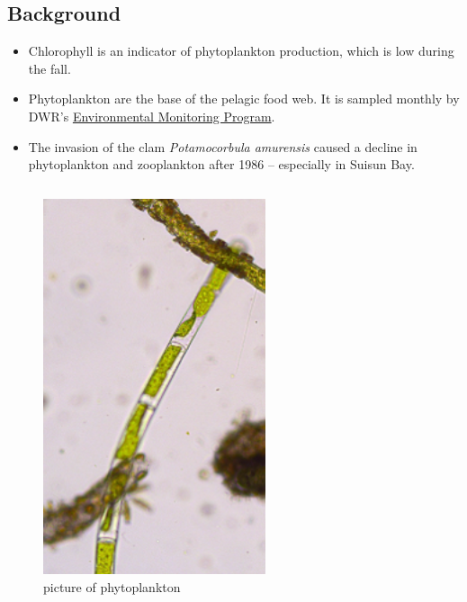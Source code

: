 \documentclass[
]{book}
\providecommand{\tightlist}{%
  \setlength{\itemsep}{0pt}\setlength{\parskip}{0pt}}
\begin{document}
\begin{columns-nocenter}

\begin{column}

\hypertarget{background-2}{%
\subsection{Background}\label{background-2}}

\begin{itemize}
\tightlist
\item
  Chlorophyll is an indicator of phytoplankton production, which is low during the fall.
\item
  Phytoplankton are the base of the pelagic food web. It is sampled monthly by DWR's \href{https://emp.baydeltalive.com/wiki/12297}{Environmental Monitoring Program}.
\item
  The invasion of the clam \emph{Potamocorbula amurensis} caused a decline in phytoplankton and zooplankton after 1986 -- especially in Suisun Bay.
\end{itemize}

\end{column}

\begin{column}

\begin{figure}

{\centering \includegraphics[width=2.57in]{figures/phyto} 

}

\caption{picture of phytoplankton}\label{fig:unnamed-chunk-106}
\end{figure}

\end{column}

\end{columns-nocenter}
\end{document}
